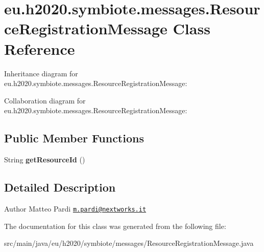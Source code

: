 \hypertarget{classeu_1_1h2020_1_1symbiote_1_1messages_1_1ResourceRegistrationMessage}{}\section{eu.\+h2020.\+symbiote.\+messages.\+Resource\+Registration\+Message Class Reference}
\label{classeu_1_1h2020_1_1symbiote_1_1messages_1_1ResourceRegistrationMessage}


Inheritance diagram for eu.\+h2020.\+symbiote.\+messages.\+Resource\+Registration\+Message\+:


Collaboration diagram for eu.\+h2020.\+symbiote.\+messages.\+Resource\+Registration\+Message\+:
\subsection*{Public Member Functions}
\begin{DoxyCompactItemize}
\item 
\mbox{\label{classeu_1_1h2020_1_1symbiote_1_1messages_1_1ResourceRegistrationMessage_a07c3e1cb72c19a84d3d6a36203fe3189}} 
String {\bfseries get\+Resource\+Id} ()
\end{DoxyCompactItemize}


\subsection{Detailed Description}
\begin{DoxyAuthor}{Author}
Matteo Pardi \href{mailto:m.pardi@nextworks.it}{\tt m.\+pardi@nextworks.\+it} 
\end{DoxyAuthor}


The documentation for this class was generated from the following file\+:\begin{DoxyCompactItemize}
\item 
src/main/java/eu/h2020/symbiote/messages/Resource\+Registration\+Message.\+java\end{DoxyCompactItemize}
